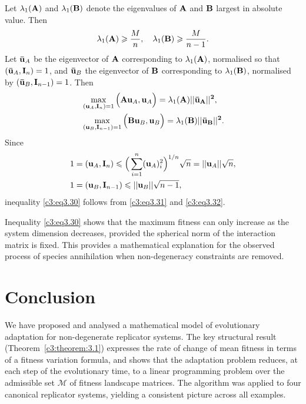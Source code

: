 \documentclass[12pt]{report}
\theoremstyle{definition}
\theoremstyle{remark}
\begin{document}
Let $\lambda_{1}({\bf A})$ and $\lambda_{1}({\bf B})$ denote the eigenvalues of ${\bf A}$ and ${\bf B}$ largest in absolute value. Then
\begin{equation}
	\lambda_{1}({\bf A}) \geqslant \frac{M}{n}, \quad \lambda_{1}({\bf B}) \geqslant \frac{M}{n - 1}.
	\label{c3:eq3.31}
\end{equation} 
Let ${\bf \bar{u}}_{A}$ be the eigenvector of ${\bf A}$ corresponding to $\lambda_{1}({\bf A})$, normalised so that $({\bf \bar{u}}_{A}, {\bf I}_{n}) = 1$, and ${\bf \bar{u}}_{B}$ the eigenvector of ${\bf B}$ corresponding to $\lambda_{1}({\bf B})$, normalised by $({\bf \bar{u}}_{B}, {\bf I}_{n - 1}) = 1$. Then
\begin{equation*}
	\begin{aligned}
		&\max\limits_{({\bf u}_{A},{\bf I}_{n}) = 1}\Big({\bf A}{\bf u}_{A}, {\bf u}_{A}\Big) = \lambda_{1}(\bf A)||{\bf \bar{u}}_{A}||^{2}, \\ 
		&\max\limits_{({\bf u}_{B},{\bf I}_{n - 1}) = 1}\Big({\bf B}{\bf u}_{B}, {\bf u}_{B}\Big) = \lambda_{1}(\bf B)||{\bf \bar{u}}_{B}||^{2}.
	\end{aligned}
\end{equation*} 
Since
\begin{equation}
	\begin{aligned}
		&\displaystyle 1 = ({\bf u}_{A}, {\bf I}_{n}) \leqslant \Big(\sum\limits_{i = 1}^{n}({\bf u}_{A})_{i}^{2}\Big)^{1/n}\sqrt{n} = ||{\bf u}_{A}||\sqrt{n}, \\
		&\displaystyle 1 = ({\bf u}_{B}, {\bf I}_{n - 1}) \leqslant ||{\bf u}_{B}||\sqrt{n - 1}, \\
	\end{aligned}
	\label{c3:eq3.32}
\end{equation} 
inequality \eqref{c3:eq3.30} follows from \eqref{c3:eq3.31} and \eqref{c3:eq3.32}.

Inequality \eqref{c3:eq3.30} shows that the maximum fitness can only increase as the system dimension decreases, provided the spherical norm of the interaction matrix is fixed. This provides a mathematical explanation for the observed process of species annihilation when non-degeneracy constraints are removed.

\section*{Conclusion}

We have proposed and analysed a mathematical model of evolutionary adaptation for
non-degenerate replicator systems. The key structural result (Theorem~\ref{c3:theorem:3.1})
expresses the rate of change of mean fitness in terms of a fitness variation
formula, and shows that the adaptation problem reduces, at each step of the
evolutionary time, to a linear programming problem over the admissible set
$\mathcal{M}$ of fitness landscape matrices. The algorithm was applied to four
canonical replicator systems, yielding a consistent picture across all examples.
\end{document}
